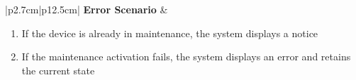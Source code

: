 \begin{table}[H]
\begin{tabular}{|p{2.7cm}|p{12.5cm}|}
        \hline
        \textbf{Error Scenario} & \begin{minipage}[t]{\linewidth}
                                      \begin{enumerate}[topsep=0pt,itemsep=1pt,parsep=0pt,partopsep=0pt]
                                          \item If the device is already in maintenance, the system displays a notice
                                          \item If the maintenance activation fails, the system displays an error and retains
                                                the current state
                                      \end{enumerate}
                                  \end{minipage} \\
        \hline
    \end{tabular}
    \label{tab:admin-enable-usb-maintenance}
\end{table}
